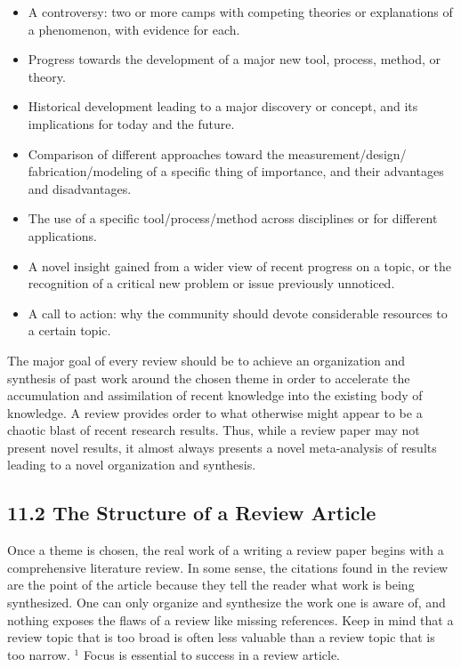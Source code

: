 \begin{itemize}
  \item A controversy: two or more camps with competing theories or explanations of a phenomenon, with evidence for each.
  \item Progress towards the development of a major new tool, process, method, or theory.
  \item Historical development leading to a major discovery or concept, and its implications for today and the future.
  \item Comparison of different approaches toward the measurement/design/ fabrication/modeling of a specific thing of importance, and their advantages and disadvantages.
  \item The use of a specific tool/process/method across disciplines or for different applications.
  \item A novel insight gained from a wider view of recent progress on a topic, or the recognition of a critical new problem or issue previously unnoticed.
  \item A call to action: why the community should devote considerable resources to a certain topic.
\end{itemize}

The major goal of every review should be to achieve an organization and synthesis of past work around the chosen theme in order to accelerate the accumulation and assimilation of recent knowledge into the existing body of knowledge. A review provides order to what otherwise might appear to be a chaotic blast of recent research results. Thus, while a review paper may not present novel results, it almost always presents a novel meta-analysis of results leading to a novel organization and synthesis.

\subsection*{11.2 The Structure of a Review Article}
Once a theme is chosen, the real work of a writing a review paper begins with a comprehensive literature review. In some sense, the citations found in the review are the point of the article because they tell the reader what work is being synthesized. One can only organize and synthesize the work one is aware of, and nothing exposes the flaws of a review like missing references. Keep in mind that a review topic that is too broad is often less valuable than a review topic that is too narrow. ${ }^{1}$ Focus is essential to success in a review article.

